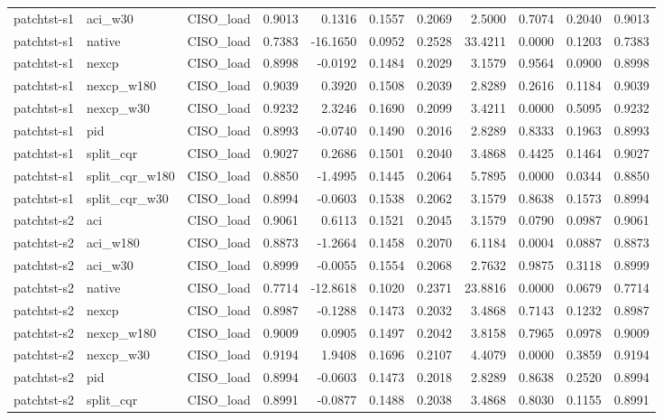 \begin{tabular}{lllrrrrrrrr}
patchtst-s1 & aci_w30 & CISO_load & 0.9013 & 0.1316 & 0.1557 & 0.2069 & 2.5000 & 0.7074 & 0.2040 & 0.9013 \\
patchtst-s1 & native & CISO_load & 0.7383 & -16.1650 & 0.0952 & 0.2528 & 33.4211 & 0.0000 & 0.1203 & 0.7383 \\
patchtst-s1 & nexcp & CISO_load & 0.8998 & -0.0192 & 0.1484 & 0.2029 & 3.1579 & 0.9564 & 0.0900 & 0.8998 \\
patchtst-s1 & nexcp_w180 & CISO_load & 0.9039 & 0.3920 & 0.1508 & 0.2039 & 2.8289 & 0.2616 & 0.1184 & 0.9039 \\
patchtst-s1 & nexcp_w30 & CISO_load & 0.9232 & 2.3246 & 0.1690 & 0.2099 & 3.4211 & 0.0000 & 0.5095 & 0.9232 \\
patchtst-s1 & pid & CISO_load & 0.8993 & -0.0740 & 0.1490 & 0.2016 & 2.8289 & 0.8333 & 0.1963 & 0.8993 \\
patchtst-s1 & split_cqr & CISO_load & 0.9027 & 0.2686 & 0.1501 & 0.2040 & 3.4868 & 0.4425 & 0.1464 & 0.9027 \\
patchtst-s1 & split_cqr_w180 & CISO_load & 0.8850 & -1.4995 & 0.1445 & 0.2064 & 5.7895 & 0.0000 & 0.0344 & 0.8850 \\
patchtst-s1 & split_cqr_w30 & CISO_load & 0.8994 & -0.0603 & 0.1538 & 0.2062 & 3.1579 & 0.8638 & 0.1573 & 0.8994 \\
patchtst-s2 & aci & CISO_load & 0.9061 & 0.6113 & 0.1521 & 0.2045 & 3.1579 & 0.0790 & 0.0987 & 0.9061 \\
patchtst-s2 & aci_w180 & CISO_load & 0.8873 & -1.2664 & 0.1458 & 0.2070 & 6.1184 & 0.0004 & 0.0887 & 0.8873 \\
patchtst-s2 & aci_w30 & CISO_load & 0.8999 & -0.0055 & 0.1554 & 0.2068 & 2.7632 & 0.9875 & 0.3118 & 0.8999 \\
patchtst-s2 & native & CISO_load & 0.7714 & -12.8618 & 0.1020 & 0.2371 & 23.8816 & 0.0000 & 0.0679 & 0.7714 \\
patchtst-s2 & nexcp & CISO_load & 0.8987 & -0.1288 & 0.1473 & 0.2032 & 3.4868 & 0.7143 & 0.1232 & 0.8987 \\
patchtst-s2 & nexcp_w180 & CISO_load & 0.9009 & 0.0905 & 0.1497 & 0.2042 & 3.8158 & 0.7965 & 0.0978 & 0.9009 \\
patchtst-s2 & nexcp_w30 & CISO_load & 0.9194 & 1.9408 & 0.1696 & 0.2107 & 4.4079 & 0.0000 & 0.3859 & 0.9194 \\
patchtst-s2 & pid & CISO_load & 0.8994 & -0.0603 & 0.1473 & 0.2018 & 2.8289 & 0.8638 & 0.2520 & 0.8994 \\
patchtst-s2 & split_cqr & CISO_load & 0.8991 & -0.0877 & 0.1488 & 0.2038 & 3.4868 & 0.8030 & 0.1155 & 0.8991 \\

\end{tabular}
